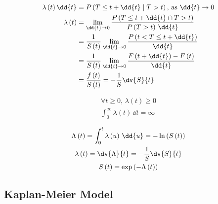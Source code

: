 \begin{subequations}\label{eq:Survival:hazard_def}
\begin{align}
\lambda\left(t\right) \dd{t} &= P\left(T \leq t + \dd{t} \mid T > t\right),\,\text{as} \,\, \dd{t} \to 0 \label{eq:Survival:hazard_def:a} \\
\lambda\left(t\right) &= \lim_{\dd{t} \to 0} \frac{P\left(T \leq t + \dd{t} \cap T > t\right)}{P\left(T > t\right)\,\dd{t}} \label{eq:Survival:hazard_def:b} \\
&= \frac{1}{S\left(t\right)} \lim_{\dd{t} \to 0} \frac{P\left(t < T \leq t + \dd{t}\right)}{\dd{t}} \label{eq:Survival:hazard_def:c} \\
&= \frac{1}{S\left(t\right)} \lim_{\dd{t} \to 0} \frac{F\left(t + \dd{t}\right) - F\left(t\right)}{\dd{t}} \label{eq:Survival:hazard_def:d} \\
&= \frac{f\left(t\right)}{S\left(t\right)} = -\frac{1}{S} \dv{S}{t} \label{eq:Survival:hazard_def:e}
\end{align}
\end{subequations}

\begin{subequations}\label{eq:Survival:hazard_cond}
\begin{gather}
\forall t \geq 0, \, \lambda\left(t\right) \geq 0 \label{eq:Survival:hazard_cond:a} \\
\int_{0}^{\infty} \lambda\left(t\right) \, \dd{t} = \infty \label{eq:Survival:hazard_cond:b}
\end{gather}
\end{subequations}

\begin{subequations}\label{eq:Survival:cum_hazard}
\begin{gather}
\Lambda\left(t\right) = \int_{0}^{t} \lambda\left(u\right) \, \dd{u} = - \ln\left(S\left(t\right)\right) \label{eq:Survival:cum_hazard:def} \\
\lambda\left(t\right) = \dv{\Lambda}{t} = -\frac{1}{S} \dv{S}{t} \label{eq:Survival:cum_hazard:to_lambda} \\
S\left(t\right) = \exp\left(-\Lambda\left(t\right)\right) \label{eq:Survival:cum_hazard:to_S}
\end{gather}
\end{subequations}

\subsection{Kaplan-Meier Model}
\label{additional:Survival:km}

